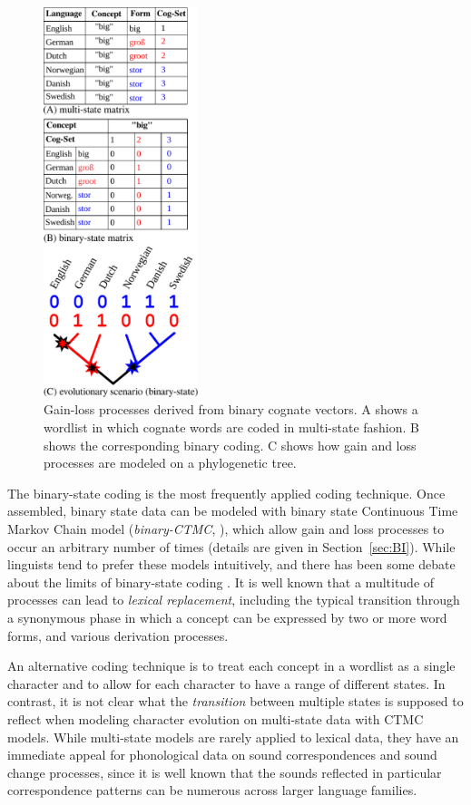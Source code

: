 \documentclass[10pt, a4paper]{article}
\begin{document}
\begin{figure}[tb!]
    \centering
    \includegraphics[width=0.4\textwidth]{figures/figure-1.pdf}
    \caption{Gain-loss processes derived from binary cognate vectors. A shows a wordlist in which
    cognate words are coded in multi-state fashion. B shows the corresponding binary coding. C shows
    how gain and loss processes are modeled on a phylogenetic tree.}\label{fig:1}
\end{figure}


The binary-state coding is the most frequently applied coding technique. Once assembled, binary state data can be modeled with binary state Continuous Time Markov Chain model (\emph{binary-CTMC}, \citealt{bouckaert2012mapping}), which allow gain and loss processes to occur an arbitrary number of times (details are given in Section~\ref{sec:BI}). While linguists tend to prefer these models intuitively, and there has been some debate about the limits of binary-state coding \citep{atkinson2006old,pagel2006estimating,List2016f}. It is well known that a multitude of processes can lead to \emph{lexical replacement}, including the typical transition through a synonymous phase in which a concept can be expressed by two or more word forms, and various derivation processes.

An alternative coding technique is to treat each concept in a wordlist as a single character and to allow for each character to have a range of different states.  In contrast, it is not clear what the \emph{transition} between multiple states is supposed to reflect when modeling character evolution on multi-state data with CTMC models. While multi-state models are rarely applied to lexical data, they have an immediate appeal for phonological data on sound correspondences and sound change processes, since it is well known that the sounds reflected in particular correspondence patterns can be numerous across larger language families.
\end{document}
